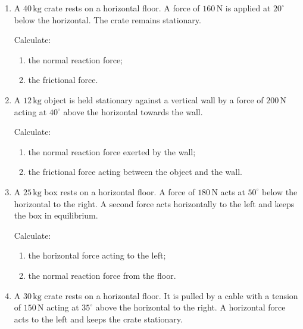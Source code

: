 \documentclass[12pt,a4paper]{article}
\begin{document}
\begin{enumerate}[leftmargin=*, itemsep=1em]
\vspace{0.8cm}

\item
A \(40\,\mathrm{kg}\) crate rests on a horizontal floor. A force of \(160\,\mathrm{N}\) is applied at \(20^\circ\) below the horizontal. The crate remains stationary.

Calculate:

\begin{enumerate}[label=(\alph*)]
    \item the normal reaction force;
    \item the frictional force.
\end{enumerate}

\vspace{0.8cm}

\newpage

\item
A \(12\,\mathrm{kg}\) object is held stationary against a vertical wall by a force of \(200\,\mathrm{N}\) acting at \(40^\circ\) above the horizontal towards the wall.

Calculate:

\begin{enumerate}[label=(\alph*)]
    \item the normal reaction force exerted by the wall;
    \item the frictional force acting between the object and the wall.
\end{enumerate}

\vspace{0.8cm}

\item
A \(25\,\mathrm{kg}\) box rests on a horizontal floor. A force of \(180\,\mathrm{N}\) acts at \(50^\circ\) below the horizontal to the right. A second force acts horizontally to the left and keeps the box in equilibrium.

Calculate:

\begin{enumerate}[label=(\alph*)]
    \item the horizontal force acting to the left;
    \item the normal reaction force from the floor.
\end{enumerate}

\vspace{0.8cm}

\item
A \(30\,\mathrm{kg}\) crate rests on a horizontal floor. It is pulled by a cable with a tension of \(150\,\mathrm{N}\) acting at \(35^\circ\) above the horizontal to the right. A horizontal force acts to the left and keeps the crate stationary.


\end{enumerate}
\end{document}
